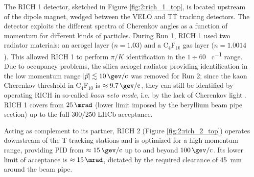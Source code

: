 The RICH 1 detector, sketched in Figure \ref{fig:2:rich_1_top}, is located upstream of the dipole magnet, wedged between the VELO and TT tracking detectors.
The detector exploits the different spectra of Cherenkov angles as a function of momentum for different kinds of particles.
During Run 1, RICH 1 used two radiator materials: an aerogel layer ($n=1.03$) and a C$_4$F$_{10}$ gas layer ($n=1.0014$).
This allowed RICH 1 to perform $\pi/K$ identification in the $1\div 60$ \si{\gev\per c} range.
Due to occupancy problems, the silica aerogel radiator providing identification in the low momentum range $|\vec{p}| \lesssim \SI{10}{\gev\per c}$ was removed for Run 2;
since the kaon Cherenkov threshold in C$_4$F$_{10}$ is $\approx \SI{9.7}{\gev\per c}$, they can still be identified by operating RICH in so-called \textit{kaon veto mode}, i.e. 
by the lack of Cherenkov light \cite{HistoryLHCb} \cite{RichPerformance}.
RICH 1 covers from $\SI{25}{\mrad}$ (lower limit imposed by the beryllium beam pipe section) up to the full 300/250 \si{\mrad} LHCb acceptance.

Acting as complement to its partner, RICH 2 (Figure \ref{fig:2:rich_2_top}) operates downstream of the T tracking stations and is optimized for a high momentum range, providing PID from $\approx \SI{15}{\gev\per c}$ up to and beyond $\SI{100}{\gev\per c}$.
Its lower limit of acceptance is $\approx \SI{15}{\mrad}$, dictated by the required clearance of \SI{45}{\milli\meter} around the beam pipe.

